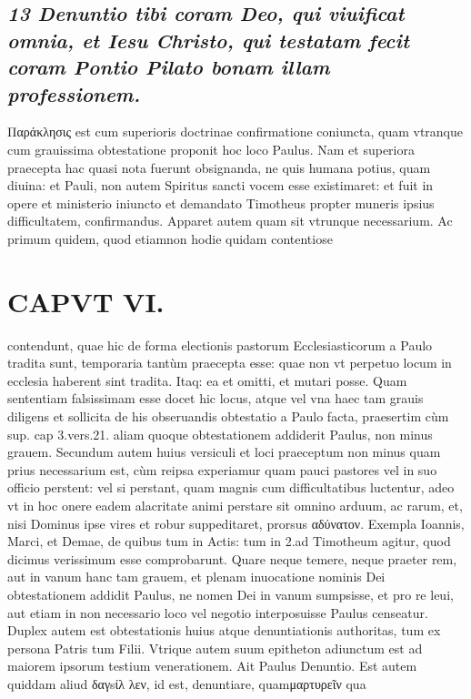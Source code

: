 \documentclass{article}
\begin{document}
\begin{pages}
\subsection*{\textit{13 Denuntio tibi coram Deo, qui viuificat omnia, et Iesu Christo, qui testatam fecit coram Pontio Pilato bonam illam professionem. }}\pstart Παράκλησις est cum superioris doctrinae confirmatione coniuncta, quam vtranque cum grauissima obtestatione proponit hoc loco Paulus. Nam et superiora praecepta hac quasi nota fuerunt obsignanda, ne quis humana potius, quam diuina: et Pauli, non autem Spiritus sancti vocem esse existimaret: et fuit in opere et ministerio iniuncto et demandato Timotheus propter muneris ipsius difficultatem, confirmandus. Apparet autem quam sit vtrunque necessarium. Ac primum quidem, quod etiamnon hodie quidam contentiose  \pend
\section*{CAPVT VI. }
\marginpar{[ p.467 ]}\pstart contendunt, quae hic de forma electionis pastorum Ecclesiasticorum a Paulo tradita sunt, temporaria tantùm praecepta esse: quae non vt perpetuo locum in ecclesia haberent sint tradita. Itaq: ea et omitti, et mutari posse. Quam sententiam falsissimam esse docet hic locus, atque vel vna haec tam grauis diligens et sollicita de his obseruandis obtestatio a Paulo facta, praesertim cùm sup. cap 3.vers.21. aliam quoque obtestationem addiderit Paulus, non minus grauem.  \pend\pstart Secundum autem huius versiculi et loci praeceptum non minus quam prius necessarium est, cùm reipsa experiamur quam pauci pastores vel in suo officio perstent: vel si perstant, quam magnis cum difficultatibus luctentur, adeo vt in hoc onere eadem alacritate animi perstare sit omnino arduum, ac rarum, et, nisi Dominus ipse vires et robur suppeditaret, prorsus αδύνατον. Exempla Ioannis, Marci, et Demae, de quibus tum in Actis: tum in 2.ad Timotheum agitur, quod dicimus verissimum esse comprobarunt. Quare neque temere, neque praeter rem, aut in vanum hanc tam grauem, et plenam inuocatione nominis Dei obtestationem addidit Paulus, ne nomen Dei in vanum sumpsisse, et pro re leui, aut etiam in non necessario loco vel negotio interposuisse Paulus censeatur.  \pend\pstart Duplex autem est obtestationis huius atque denuntiationis authoritas, tum ex persona Patris tum Filii. Vtrique  autem suum epitheton adiunctum est ad maiorem ipsorum testium venerationem. Ait Paulus Denuntio. Est autem quiddam aliud δαγsίλ λεν, id est, denuntiare, quamμαρτυρεῖν qua  \pend

\end{pages}
\end{document}
